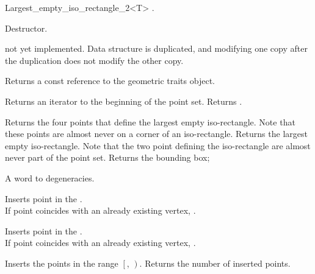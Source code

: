 \begin{ccRefClass}{Largest_empty_iso_rectangle_2<T>}
{.} 

{Destructor.}

\ccOperations
{}


{not yet implemented. Data structure is duplicated, and modifying one copy after the 
duplication does not modify the other copy.}



\ccAccessFunctions

{Returns a const reference to the geometric traits object.}


{Returns an iterator to the beginning of the point set.}
{Returns .}



{Returns the four points that define the largest empty iso-rectangle.
Note that these points are almost never on a corner of an iso-rectangle.}
\ccGlue
{}
{Returns the largest empty iso-rectangle. Note that the two
point defining the iso-rectangle are almost never part of 
the point set.}
\ccGlue
{}
{Returns  the bounding box;}

A word to degeneracies.

{Inserts point  in the .\\
If point  coincides with an already existing vertex, .}

{Inserts point  in the .\\
If point  coincides with an already existing vertex, .}


{Inserts the points in the range $\left[\right.$,
$\left.\right)$.  Returns the number of inserted points.
}


\end{ccRefClass}
